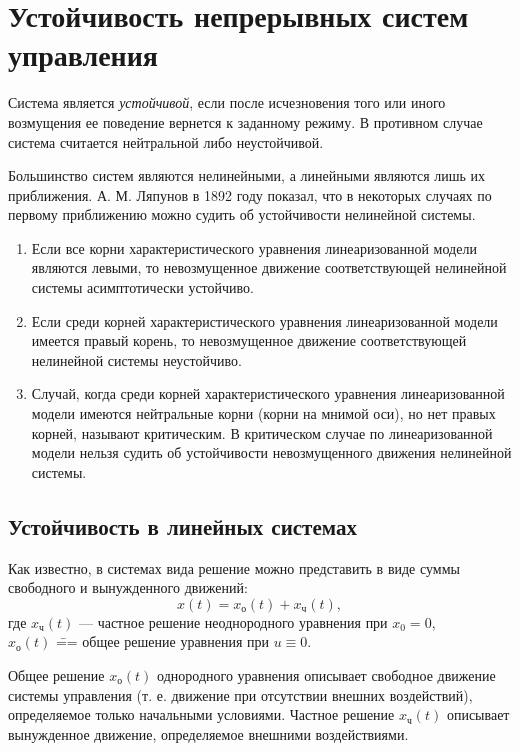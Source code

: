 \documentclass[../../TAU.tex]{subfiles}
\begin{document}
\chapter{Устойчивость непрерывных систем управления}

     Система является {\it устойчивой}, если после исчезновения того или иного возмущения ее поведение вернется к заданному режиму. В противном случае система считается нейтральной либо неустойчивой. \par
    Большинство систем являются нелинейными, а линейными являются лишь их приближения. А. М. Ляпунов в 1892 году показал, что в некоторых случаях по первому приближению можно судить об устойчивости нелинейной системы.

    \begin{enumerate}
        \item Если все корни характеристического уравнения линеаризованной модели являются левыми, то невозмущенное движение соответствующей нелинейной системы асимптотически устойчиво.
        \item Если среди корней характеристического уравнения линеаризованной модели имеется правый корень, то невозмущенное движение соответствующей нелинейной системы неустойчиво.
        \item Случай, когда среди корней характеристического уравнения линеаризованной модели имеются нейтральные корни (корни на мнимой оси), но нет правых корней, называют критическим. В критическом случае по линеаризованной модели нельзя судить об устойчивости невозмущенного движения нелинейной системы. 

    \end{enumerate}

\section{Устойчивость в линейных системах}

    \normalfont
    Как известно, в системах вида
    решение можно представить в виде суммы свободного и вынужденного движений:
    $$
        x(t) = x_\text{о}(t) + x_\text{ч}(t),
    $$
    где $x_\text{ч}(t)$ --- частное решение неоднородного уравнения при 
    $x_0 = 0$,\\ $x_\text{о}(t)$ \=== общее решение уравнения при 
    $u\equiv0$.
    \par
    Общее решение $x_\text{о}(t)$ однородного уравнения описывает свободное движение системы управления (т. е. движение при отсутствии внешних воздействий), определяемое только начальными условиями. Частное решение $x_\text{ч}(t)$ описывает вынужденное движение, определяемое внешними воздействиями.
\end{document}
